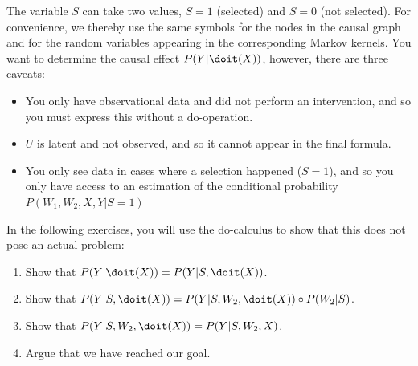 \begin{enumerate}
  The variable $S$ can take two values, $S = 1$ (selected) and $S = 0$ (not selected).
  For convenience, we thereby use the same symbols for the nodes in the causal graph and for the random variables appearing in the corresponding Markov kernels.
  You want to determine the causal effect $P(Y | \doit(X))$, however, there are three caveats:
  \begin{itemize}
    \item You only have observational data and did not perform an intervention, and so you must express this without a do-operation.
    \item $U$ is latent and not observed, and so it cannot appear in the final formula.
    \item You only see data in cases where a selection happened ($S = 1$), and so you only have access to an estimation of the conditional probability $P(W_1, W_2, X, Y | S = 1)$
  \end{itemize}

  In the following exercises, you will use the do-calculus to show that this does not pose an actual problem:

  \begin{enumerate}
    \item Show that $P(Y | \doit(X)) = P(Y | S, \doit(X))$.
    \item Show that $P(Y | S, \doit(X)) = P(Y | S, W_2, \doit(X)) \circ P(W_2 | S)$.
    \item Show that  $P(Y | S, W_2, \doit(X)) = P(Y | S, W_2, X)$.
    \item Argue that we have reached our goal.
  \end{enumerate}


\end{enumerate}
